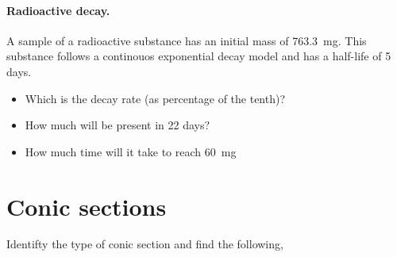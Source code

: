 \documentclass{tufte-handout} %
\begin{document}
\paragraph{Radioactive decay.} A sample of a radioactive substance has an initial mass of \SI{763.3}{\milli\gram}.
This substance follows a continouos exponential decay model and has a half-life of 5 days.
\begin{itemize}
    \item Which is the decay rate (as percentage of the tenth)?
    \item How much will be present in 22 days?
    \item How much time will it take to reach \SI{60}{\milli\gram}
\end{itemize}



\section{Conic sections}

Identifty the type of conic section and find the following,

\vspace{2em}
\end{document}
